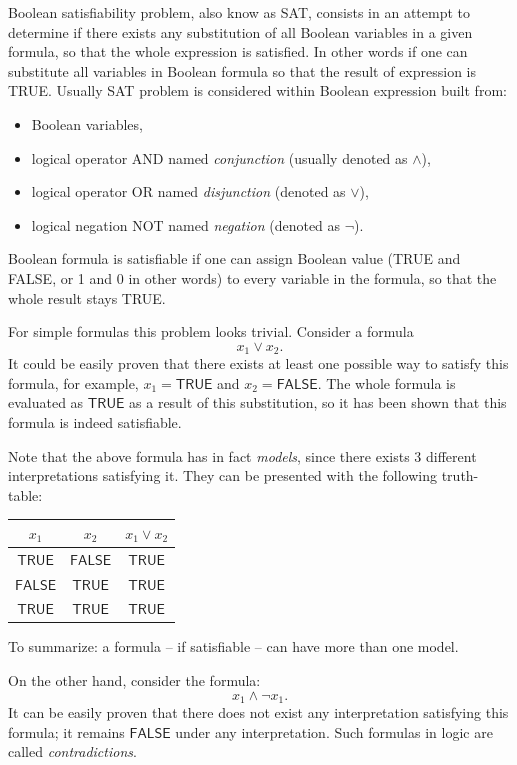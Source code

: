 \documentclass[12pt,english,pdflatex]{aghdpl}
\begin{document}
Boolean satisfiability problem, also know as SAT, consists in an attempt to determine
if there exists any substitution of all Boolean variables in a given formula,
so that the whole expression is satisfied. In other words if one can
substitute all variables in Boolean formula so that the result of
expression is TRUE. Usually SAT problem is considered within Boolean
expression built from:
\begin{itemize}
\item Boolean variables,
\item logical operator AND named \textit{conjunction} (usually denoted as $\wedge$),
\item logical operator OR named \textit{disjunction} (denoted as $\vee$),
\item logical negation NOT named \textit{negation} (denoted as $\neg$). 
\end{itemize}
Boolean formula is satisfiable if one can assign Boolean value (TRUE
and FALSE, or 1 and 0 in other words) to every variable in the formula,
so that the whole result stays TRUE.

For simple formulas this problem looks trivial. Consider a formula
\[
x_{1}\vee x_{2}.
\]
It could be easily proven that there
exists at least one possible way to satisfy this formula, for example,
$x_{1}=\mathsf{TRUE}$ and $x_{2}=\mathsf{FALSE}$. The whole formula
is evaluated as $\mathsf{TRUE}$ as a result of this substitution, so it has been
shown that this formula is indeed satisfiable. 

Note that the above formula has in fact \textit{models}, since there exists 3 different interpretations satisfying it. They can be presented with the following truth-table:

\begin{center}
\setlength{\tabcolsep}{6pt}
\begin{tabular}{cc@{\qquad}c}
  $x_{1}$ & $x_{2}$ & $x_{1} \vee x_{2}$ \\
\hline\hline
  $\mathsf{TRUE}$  &   $\mathsf{FALSE}$ &  $\mathsf{TRUE}$ \\
  $\mathsf{FALSE}$ &   $\mathsf{TRUE}$  &  $\mathsf{TRUE}$ \\
  $\mathsf{TRUE}$  &   $\mathsf{TRUE}$  &  $\mathsf{TRUE}$
\end{tabular}
\end{center}
To summarize: a formula -- if satisfiable -- can have more than one model.

On the other hand, consider the  formula:
\[
x_{1}\wedge \neg x_{1}.
\]
It can be easily proven that there  does not exist any interpretation satisfying this formula; it remains $\mathsf{FALSE}$ under any interpretation. Such formulas in logic are called \textit{contradictions}.
\end{document}
